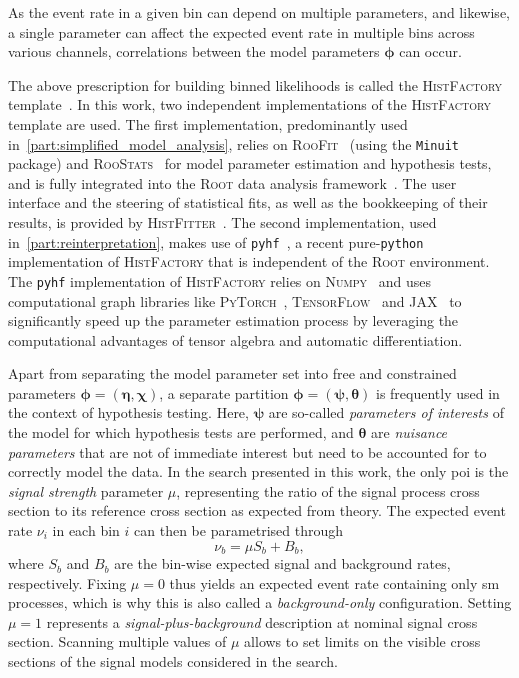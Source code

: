 As the event rate in a given bin can depend on multiple parameters, and likewise, a single parameter can affect the expected event rate in multiple bins across various channels, correlations between the model parameters $\boldsymbol{\phi}$ can occur.

The above prescription for building binned likelihoods is called the \textsc{HistFactory} template~\cite{Cranmer:1456844}. In this work, two independent implementations of the \textsc{HistFactory} template are used.
The first implementation, predominantly used in~\cref{part:simplified_model_analysis}, relies on \textsc{RooFit}~\cite{RooFit:2003ir} (using the \texttt{Minuit}~\cite{James:310399} package) and \textsc{RooStats}~\cite{RooStats:2010pm} for model parameter estimation and hypothesis tests, and is fully integrated into the \textsc{Root} data analysis framework~\cite{ROOT:1997pa,ROOT-2}. The user interface and the steering of statistical fits, as well as the bookkeeping of their results, is provided by \textsc{HistFitter}~\cite{HistFitter:2014wma}.
The second implementation, used in~\cref{part:reinterpretation}, makes use of \texttt{pyhf}~\cite{pyhf_joss,pyhf}, a recent pure-\texttt{python} implementation of \textsc{HistFactory} that is independent of the \textsc{Root} environment.
The \texttt{pyhf} implementation of \textsc{HistFactory} relies on \textsc{Numpy}~\cite{numpy} and uses computational graph libraries like \textsc{PyTorch}~\cite{pytorch}, \textsc{TensorFlow}~\cite{tensorflow2015-whitepaper} and \textsc{JAX}~\cite{jax2018github} to significantly speed up the parameter estimation process by leveraging the computational advantages of tensor algebra and automatic differentiation.
 
Apart from separating the model parameter set into free and constrained parameters $\boldsymbol{\phi} = (\boldsymbol{\eta},\boldsymbol{\chi})$, a separate partition $\boldsymbol{\phi} = (\boldsymbol{\psi},\boldsymbol{\theta})$ is frequently used in the context of hypothesis testing.
Here, $\boldsymbol{\psi}$ are so-called \textit{parameters of interests} of the model for which hypothesis tests are performed, and $\boldsymbol{\theta}$ are \textit{nuisance parameters} that are not of immediate interest but need to be accounted for to correctly model the data.
In the search presented in this work, the only \gls{poi} is the \textit{signal strength} parameter $\mu$, representing the ratio of the signal process cross section to its reference cross section as expected from theory.
The expected event rate $\nu_i$ in each bin $i$ can then be parametrised through
\begin{equation}
	\nu_b = \mu S_b + B_b,
\end{equation}
where $S_b$ and $B_b$ are the bin-wise expected signal and background rates, respectively. Fixing $\mu = 0$ thus yields an expected event rate containing only \gls{sm} processes, which is why this is also called a \textit{background-only} configuration. Setting $\mu = 1$ represents a \textit{signal-plus-background} description at nominal signal cross section. Scanning multiple values of $\mu$ allows to set limits on the visible cross sections of the signal models considered in the search. 
  
